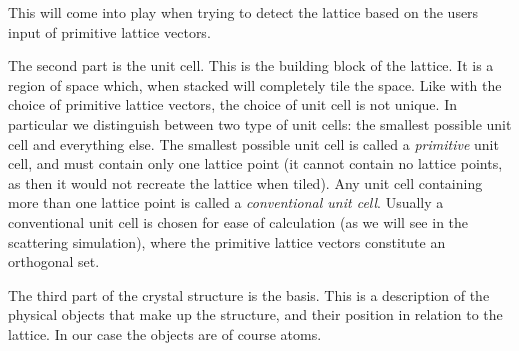 \documentclass[a4paper,10pt]{article}
\numberwithin{equation}{section}
\begin{document}
	This will come into play when trying to detect the lattice based on the users input of primitive lattice vectors. 
	
	The second part is the unit cell. This is the building block of the lattice. It is a region of space which, when stacked will completely tile the space. Like with the choice of primitive lattice vectors, the choice of unit cell is not unique. In particular we distinguish between two type of unit cells: the smallest possible unit cell and everything else. The smallest possible unit cell is called a \textit{primitive} unit cell, and must contain only one lattice point (it cannot contain no lattice points, as then it would not recreate the lattice when tiled). Any unit cell containing more than one lattice point is called a \textit{conventional unit cell}. Usually a conventional unit cell is chosen for ease of calculation (as we will see in the scattering simulation), where the primitive lattice vectors constitute an orthogonal set.
	
	The third part of the crystal structure is the basis. This is a description of the physical objects that make up the structure, and their position in relation to the lattice. In our case the objects are of course atoms. 
	
	
	
	
\end{document}
